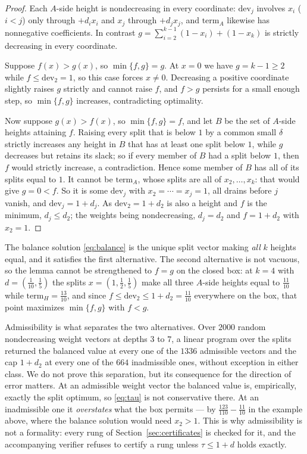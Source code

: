 \documentclass[11pt]{article}
\theoremstyle{definition}
\begin{document}
\begin{proof}
Each $A$-side height is nondecreasing in every coordinate: $\mathrm{dev}_j$
involves $x_i$ ($i<j$) only through $+d_ix_i$ and $x_j$ through $+d_jx_j$,
and $\mathrm{term}_A$ likewise has nonnegative coefficients.  In contrast
$g=\sum_{i=2}^{k-1}(1-x_i)+(1-x_k)$ is strictly decreasing in every
coordinate.

Suppose $f(x)>g(x)$, so $\min\{f,g\}=g$.  At $x=0$ we have $g=k-1\ge2$
while $f\le\mathrm{dev}_2=1$, so this case forces $x\ne0$.  Decreasing a
positive coordinate slightly raises $g$ strictly and cannot raise $f$, and
$f>g$ persists for a small enough step, so $\min\{f,g\}$ increases,
contradicting optimality.

Now suppose $g(x)>f(x)$, so $\min\{f,g\}=f$, and let $B$ be the set of
$A$-side heights attaining $f$.  Raising every split that is below $1$ by
a common small $\delta$ strictly increases any height in $B$ that has at
least one split below $1$, while $g$ decreases but retains its slack; so
if every member of $B$ had a split below $1$, then $f$ would strictly
increase, a contradiction.  Hence some member of $B$ has all of its splits
equal to $1$.  It cannot be $\mathrm{term}_A$, whose splits are all of
$x_2,\ldots,x_k$: that would give $g=0<f$.  So it is some
$\mathrm{dev}_j$ with $x_2=\cdots=x_j=1$, all drains before $j$ vanish,
and $\mathrm{dev}_j=1+d_j$.  As $\mathrm{dev}_2=1+d_2$ is also a height
and $f$ is the minimum, $d_j\le d_2$; the weights being nondecreasing,
$d_j=d_2$ and $f=1+d_2$ with $x_2=1$.
\end{proof}

\noindent
The balance solution \eqref{eq:balance} is the unique split vector making
\emph{all} $k$ heights equal, and it satisfies the first alternative.  The
second alternative is not vacuous, so the lemma cannot be strengthened to
$f=g$ on the closed box: at $k=4$ with $d=(\tfrac1{10},\tfrac15)$ the
splits $x=(1,\tfrac12,\tfrac15)$ make all three $A$-side heights equal to
$\tfrac{11}{10}$ while $\mathrm{term}_H=\tfrac{13}{10}$, and since
$f\le\mathrm{dev}_2\le1+d_2=\tfrac{11}{10}$ everywhere on the box, that
point maximizes $\min\{f,g\}$ with $f<g$.

Admissibility is what separates the two alternatives.  Over $2000$ random
nondecreasing weight vectors at depths $3$ to $7$, a linear program over
the splits returned the balanced value at every one of the $1336$
admissible vectors and the cap $1+d_2$ at every one of the $664$
inadmissible ones, without exception in either class.  We do not prove
this separation, but its consequence for the direction of error matters.
At an admissible weight vector the balanced value is, empirically,
exactly the split optimum, so \eqref{eq:tau} is not conservative there.
At an inadmissible one it \emph{overstates} what the box permits --- by
$\tfrac{123}{110}-\tfrac{11}{10}$ in the example above, where the balance
solution would need $x_2>1$.  This is why admissibility is not a
formality: every rung of Section~\ref{sec:certificates} is checked for it,
and the accompanying verifier refuses to certify a rung unless
$\tau\le1+d$ holds exactly.
\end{document}
